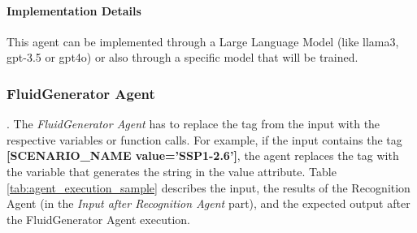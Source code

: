 \paragraph{Implementation Details}
This agent can be implemented through a Large Language Model (like llama3, gpt-3.5 or gpt\-4o) or also through a specific model that will be trained.

\subsubsection{FluidGenerator Agent}.
The \textit{FluidGenerator Agent} has to replace the tag from the input with the respective variables or function calls. For example, if the input contains the tag \textbf{[SCENARIO\_NAME value='SSP1-2.6']}, the agent replaces the tag with the variable that generates the string in the value attribute. Table \ref{tab:agent_execution_sample} describes the input, the results of the Recognition Agent (in the \textit{Input after Recognition Agent} part), and the expected output after the FluidGenerator Agent execution.

